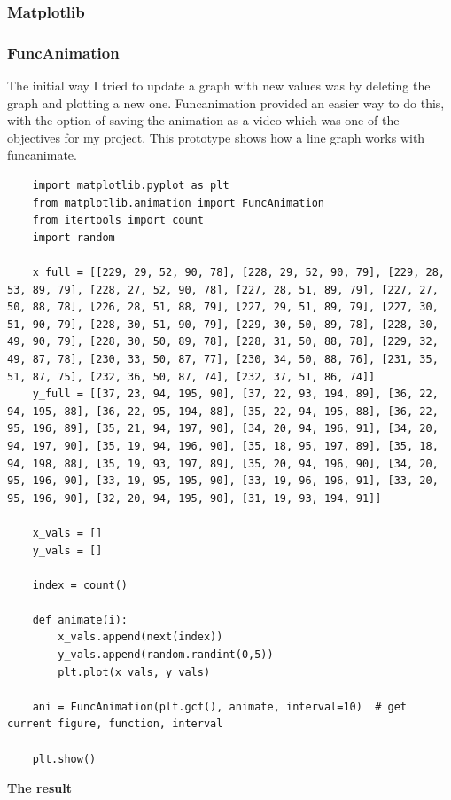 \documentclass[11pt, a4paper]{article}
\begin{document}
\subsubsection{Matplotlib}
\subsubsection{FuncAnimation}
The initial way I tried to update a graph with new values was by deleting the graph and plotting a new one. Funcanimation provided an easier way to do this, with the option of saving the animation as a video which was one of the objectives for my project. This prototype shows how a line graph works with funcanimate.

\begin{lstlisting}
    import matplotlib.pyplot as plt
    from matplotlib.animation import FuncAnimation
    from itertools import count
    import random
    
    x_full = [[229, 29, 52, 90, 78], [228, 29, 52, 90, 79], [229, 28, 53, 89, 79], [228, 27, 52, 90, 78], [227, 28, 51, 89, 79], [227, 27, 50, 88, 78], [226, 28, 51, 88, 79], [227, 29, 51, 89, 79], [227, 30, 51, 90, 79], [228, 30, 51, 90, 79], [229, 30, 50, 89, 78], [228, 30, 49, 90, 79], [228, 30, 50, 89, 78], [228, 31, 50, 88, 78], [229, 32, 49, 87, 78], [230, 33, 50, 87, 77], [230, 34, 50, 88, 76], [231, 35, 51, 87, 75], [232, 36, 50, 87, 74], [232, 37, 51, 86, 74]]
    y_full = [[37, 23, 94, 195, 90], [37, 22, 93, 194, 89], [36, 22, 94, 195, 88], [36, 22, 95, 194, 88], [35, 22, 94, 195, 88], [36, 22, 95, 196, 89], [35, 21, 94, 197, 90], [34, 20, 94, 196, 91], [34, 20, 94, 197, 90], [35, 19, 94, 196, 90], [35, 18, 95, 197, 89], [35, 18, 94, 198, 88], [35, 19, 93, 197, 89], [35, 20, 94, 196, 90], [34, 20, 95, 196, 90], [33, 19, 95, 195, 90], [33, 19, 96, 196, 91], [33, 20, 95, 196, 90], [32, 20, 94, 195, 90], [31, 19, 93, 194, 91]]
    
    x_vals = []
    y_vals = []
    
    index = count()
    
    def animate(i):
        x_vals.append(next(index))
        y_vals.append(random.randint(0,5))
        plt.plot(x_vals, y_vals)
    
    ani = FuncAnimation(plt.gcf(), animate, interval=10)  # get current figure, function, interval
    
    plt.show()
\end{lstlisting}
\textbf{The result}
\end{document}
